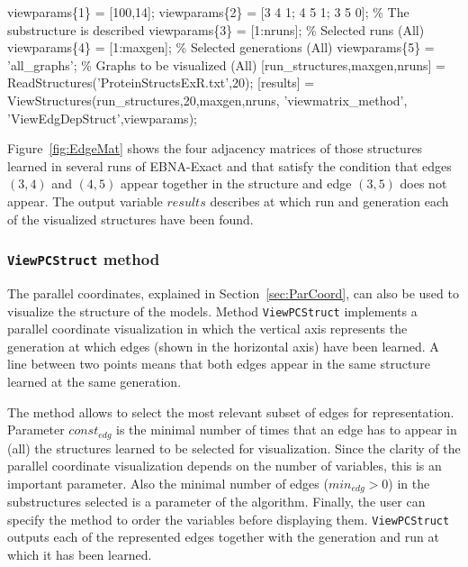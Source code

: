 \documentclass[a4paper]{article}
\begin{document}
 \begin{example}
  \begin{programf}
   viewparams\{1\} = [100,14];
   viewparams\{2\} = [3 4 1; 4 5 1; 3 5 0]; \% The substructure is described
   viewparams\{3\} = [1:nruns]; \% Selected runs (All)
   viewparams\{4\} = [1:maxgen]; \% Selected generations (All)
   viewparams\{5\} = 'all\_graphs'; \% Graphs to be visualized (All)
   [run\_structures,maxgen,nruns] = ReadStructures('ProteinStructsExR.txt',20);
   [results] = ViewStructures(run\_structures,20,maxgen,nruns, 'viewmatrix\_method',
   'ViewEdgDepStruct',viewparams);  \UnnumLine \end{programf}
\label{ex:ViewEdgDepStruct} \end{example}

 Figure~\ref{fig:EdgeMat} shows the four adjacency matrices of those structures
 learned in several runs
  of EBNA-Exact and that satisfy the condition that
 edges $(3,4)$ and $(4,5)$ appear together in the structure and edge $(3,5)$ does not
 appear. The output variable \emph{$results$} describes at
  which run and generation each of the visualized structures have  been found.

\subsubsection{\texttt{ViewPCStruct} method}

The parallel coordinates, explained in Section~\ref{sec:ParCoord},
can also be used to visualize the structure of the models. Method
\texttt{ViewPCStruct} implements a parallel coordinate visualization
in which the   vertical axis represents the generation at which
edges (shown in the horizontal axis) have been learned. A line
between two points means that both edges appear in the same
structure learned at the same generation.

The method allows to select the most relevant subset of edges for
representation. Parameter $const_{edg}$ is the  minimal number of
times that an edge has to appear in (all) the structures learned to
be selected for visualization. Since the  clarity of the parallel
coordinate  visualization depends on the number of variables, this is
an important parameter. Also the minimal number of edges
($min_{edg}>0$) in the substructures selected is a parameter of the
algorithm. Finally, the user can specify the method to order
the variables before displaying them. \texttt{ViewPCStruct} outputs
each of the represented edges together with the generation and run
at which it has  been learned.
\end{document}
